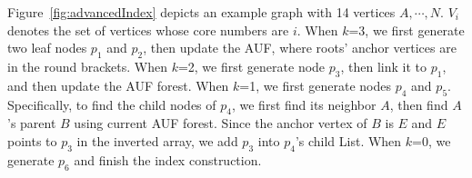 \begin{example}
Figure~\ref{fig:advancedIndex} depicts an example graph with 14 vertices {$A,\cdots,N$}.
$V_i$ denotes the set of vertices whose core numbers are $i$.
When $k$=3, we first generate two leaf nodes $p_1$ and $p_2$,
then update the AUF, where roots' anchor vertices are in the round brackets.
When $k$=2, we first generate node $p_3$, then link it to $p_1$,
and then update the AUF forest.
When $k$=1, we first generate nodes $p_4$ and $p_5$.
Specifically, to find the child nodes of $p_4$,
we first find its neighbor $A$,
then find $A$'s parent $B$ using current AUF forest.
Since the anchor vertex of $B$ is $E$ and $E$ points to $p_3$ in the inverted array,
we add $p_3$ into $p_4$'s child List.
When $k$=0, we generate $p_6$ and finish the index construction.
\end{example}

